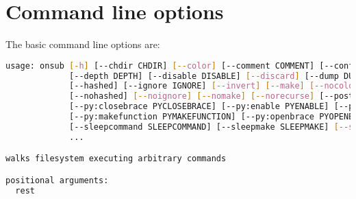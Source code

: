 \section{Command line options}

The basic command line options are:

\begin{snugshade}
\begin{lstlisting}[language=bash]
usage: onsub [-h] [--chdir CHDIR] [--color] [--comment COMMENT] [--configfile CONFIGFILE] [--count COUNT] [--debug]
			 [--depth DEPTH] [--disable DISABLE] [--discard] [--dump DUMP] [--dumpall] [--enable ENABLE] [--file FILE]
			 [--hashed] [--ignore IGNORE] [--invert] [--make] [--nocolor] [--noenable] [--noexec] [--nofile]
			 [--nohashed] [--noignore] [--nomake] [--norecurse] [--postconfig POSTCONFIG] [--preconfig PRECONFIG]
			 [--py:closebrace PYCLOSEBRACE] [--py:enable PYENABLE] [--py:makecommand PYMAKECOMMAND]
			 [--py:makefunction PYMAKEFUNCTION] [--py:openbrace PYOPENBRACE] [--py:priority PYPRIORITY] [--recurse]
			 [--sleepcommand SLEEPCOMMAND] [--sleepmake SLEEPMAKE] [--suppress] [--verbose VERBOSE] [--workers WORKERS]
			 ...

walks filesystem executing arbitrary commands

positional arguments:
  rest


\end{lstlisting}
\end{snugshade}
